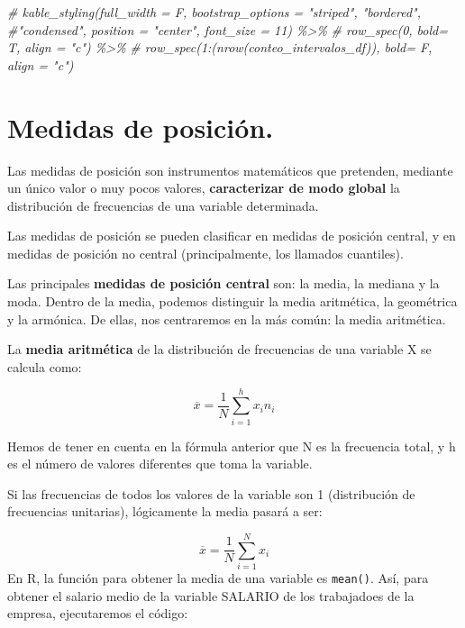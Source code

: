 \documentclass[
]{book}
\newenvironment{Shaded}{\begin{snugshade}}{\end{snugshade}}
\newcommand{\CommentTok}[1]{\textcolor[rgb]{0.56,0.35,0.01}{\textit{#1}}}
\newcommand{\DocumentationTok}[1]{\textcolor[rgb]{0.56,0.35,0.01}{\textbf{\textit{#1}}}}
\newcommand{\FunctionTok}[1]{\textcolor[rgb]{0.13,0.29,0.53}{\textbf{#1}}}
\newcommand{\NormalTok}[1]{#1}
\newcommand{\OtherTok}[1]{\textcolor[rgb]{0.56,0.35,0.01}{#1}}
\newcommand{\SpecialCharTok}[1]{\textcolor[rgb]{0.81,0.36,0.00}{\textbf{#1}}}
\begin{document}
\begin{Shaded}
\begin{Highlighting}[]
\CommentTok{\#  kable\_styling(full\_width = F, bootstrap\_options = "striped", "bordered", \#"condensed", position = "center", font\_size = 11) \%\textgreater{}\%}
\CommentTok{\#  row\_spec(0, bold= T, align = "c") \%\textgreater{}\%}
\CommentTok{\#  row\_spec(1:(nrow(conteo\_intervalos\_df)), bold= F, align = "c")}
\end{Highlighting}
\end{Shaded}

\section{Medidas de posición.}\label{medidas-de-posiciuxf3n.}

Las medidas de posición son instrumentos matemáticos que pretenden, mediante un único valor o muy pocos valores, \textbf{caracterizar de modo global} la distribución de frecuencias de una variable determinada.

Las medidas de posición se pueden clasificar en medidas de posición central, y en medidas de posición no central (principalmente, los llamados cuantiles).

Las principales \textbf{medidas de posición central} son: la media, la mediana y la moda.
Dentro de la media, podemos distinguir la media aritmética, la geométrica y la armónica.
De ellas, nos centraremos en la más común: la media aritmética.

La \textbf{media aritmética} de la distribución de frecuencias de una variable X se calcula como:

\[
\overline{x} = \frac{1}{N} \sum_{i=1}^{h} x_i n_i
\]

Hemos de tener en cuenta en la fórmula anterior que N es la frecuencia total, y h es el número de valores diferentes que toma la variable.

Si las frecuencias de todos los valores de la variable son 1 (distribución de frecuencias unitarias), lógicamente la media pasará a ser:

\[
\overline{x} = \frac{1}{N} \sum_{i=1}^{N} x_i
\] En R, la función para obtener la media de una variable es \texttt{mean()}.
Así, para obtener el salario medio de la variable SALARIO de los trabajadoes de la empresa, ejecutaremos el código:

\begin{Shaded}
\end{Shaded}
\end{document}
